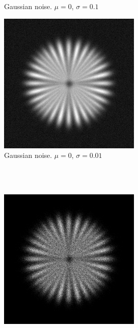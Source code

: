 \documentclass{./packages/optica-article}
\begin{document}
\begin{figure}[hbp]
\begin{center}
\begin{subfigure}[t]{0.25\textwidth}
			\caption{Gaussian noise. $\mu=0$, $\sigma=0.1$}\label{fig:sim:ng0.1}
		\end{subfigure}
		\hfill
		\begin{subfigure}[t]{0.25\textwidth}\centering
			\centering
			\includegraphics[width=\textwidth]{Simulation deconvolution/ref_ng_0.01}
			\caption{Gaussian noise. $\mu=0$, $\sigma=0.01$}\label{fig:sim:ng0.01}
		\end{subfigure}
		\hfill\,
		\\
		\hfill\,
		\begin{subfigure}[t]{0.25\textwidth}\centering
			\centering
			\includegraphics[width=\textwidth]{Simulation deconvolution/ref_np_0.01}

\end{subfigure}
\end{center}
\end{figure}
\end{document}
